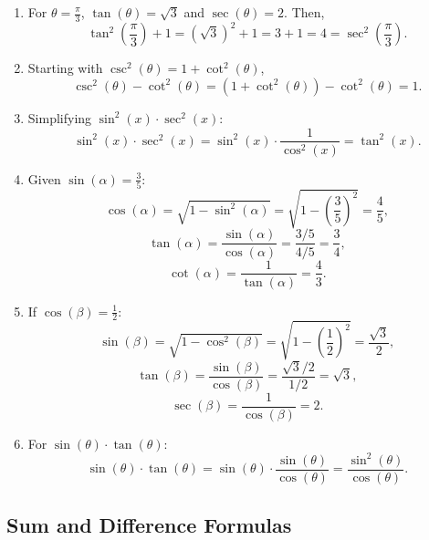 \documentclass[a4paper,12pt]{book}
\begin{document}
\begin{enumerate}
    \item For $\theta = \frac{\pi}{3}$, $\tan(\theta) = \sqrt{3}$ and $\sec(\theta) = 2$. Then,
    \[
    \tan^2\left(\frac{\pi}{3}\right) + 1 = (\sqrt{3})^2 + 1 = 3 + 1 = 4 = \sec^2\left(\frac{\pi}{3}\right).
    \]

    \item Starting with $\csc^2(\theta) = 1 + \cot^2(\theta)$,
    \[
    \csc^2(\theta) - \cot^2(\theta) = (1 + \cot^2(\theta)) - \cot^2(\theta) = 1.
    \]

    \item Simplifying $\sin^2(x) \cdot \sec^2(x)$:
    \[
    \sin^2(x) \cdot \sec^2(x) = \sin^2(x) \cdot \frac{1}{\cos^2(x)} = \tan^2(x).
    \]

    \item Given $\sin(\alpha) = \frac{3}{5}$:
    \[
    \cos(\alpha) = \sqrt{1 - \sin^2(\alpha)} = \sqrt{1 - \left(\frac{3}{5}\right)^2} = \frac{4}{5},
    \]
    \[
    \tan(\alpha) = \frac{\sin(\alpha)}{\cos(\alpha)} = \frac{3/5}{4/5} = \frac{3}{4},
    \]
    \[
    \cot(\alpha) = \frac{1}{\tan(\alpha)} = \frac{4}{3}.
    \]

    \item If $\cos(\beta) = \frac{1}{2}$:
    \[
    \sin(\beta) = \sqrt{1 - \cos^2(\beta)} = \sqrt{1 - \left(\frac{1}{2}\right)^2} = \frac{\sqrt{3}}{2},
    \]
    \[
    \tan(\beta) = \frac{\sin(\beta)}{\cos(\beta)} = \frac{\sqrt{3}/2}{1/2} = \sqrt{3},
    \]
    \[
    \sec(\beta) = \frac{1}{\cos(\beta)} = 2.
    \]

    \item For $\sin(\theta) \cdot \tan(\theta)$:
    \[
    \sin(\theta) \cdot \tan(\theta) = \sin(\theta) \cdot \frac{\sin(\theta)}{\cos(\theta)} = \frac{\sin^2(\theta)}{\cos(\theta)}.
    \]
\end{enumerate}



\subsection{Sum and Difference Formulas}
\label{subsec:sum_difference_formulas}
\end{document}
